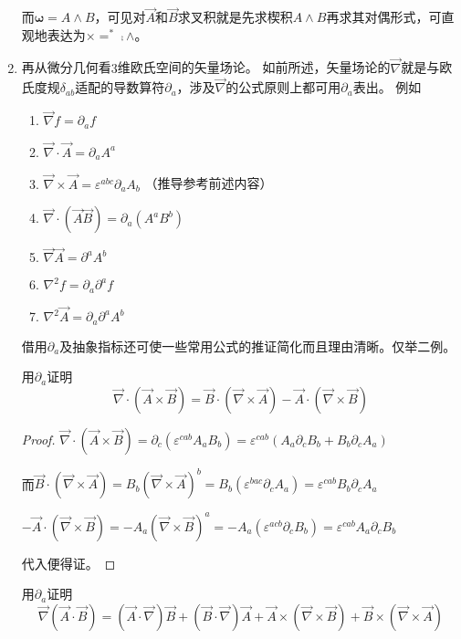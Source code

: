 \begin{enumerate}[（1）]
    而$\bm\omega = A \wedge B$，可见对$\vec A$和$\vec B$求叉积就是先求楔积$A \wedge B$再求其对偶形式，可直观地表达为$\times = ^* \comp \wedge$。
    \item 再从微分几何看$3$维欧氏空间的矢量场论。
    如前所述，矢量场论的$\vec\nabla$就是与欧氏度规$\delta_{ab}$适配的导数算符$\partial_a$，涉及$\vec\nabla$的公式原则上都可用$\partial_a$表出。
    例如
    \begin{enumerate}[（a）]
        \item $\vec\nabla f = \partial_af$
        \item $\vec\nabla \cdot \vec A = \partial_aA^a$
        \item $\vec\nabla \times \vec A = \varepsilon^{abc}\partial_aA_b$ （推导参考前述内容）
        \item $\vec\nabla \cdot (\vec A \vec B) = \partial_a(A^aB^b)$
        \item $\vec\nabla\vec A = \partial^aA^b$
        \item $\nabla^2f = \partial_a\partial^af$
        \item $\nabla^2\vec A = \partial_a\partial^aA^b$
    \end{enumerate}
    借用$\partial_a$及抽象指标还可使一些常用公式的推证简化而且理由清晰。仅举二例。
    
    \begin{example}
    用$\partial_a$证明
    $$\vec\nabla\cdot(\vec A \times \vec B) = \vec B \cdot (\vec\nabla \times \vec A) - \vec A \cdot (\vec\nabla \times \vec B)$$
    \end{example}

    \begin{proof}
        $\vec\nabla\cdot(\vec A \times \vec B) = \partial_c(\varepsilon^{cab}A_aB_b) = \varepsilon^{cab}(A_a\partial_cB_b + B_b\partial_cA_a)$
        
        而$\vec B \cdot (\vec\nabla \times \vec A) = B_b(\vec\nabla \times \vec A)^b = B_b(\varepsilon^{bac}\partial_cA_a) = \varepsilon^{cab}B_b\partial_cA_a$
        
        $-\vec A \cdot (\vec\nabla \times \vec B) = -A_a(\vec\nabla \times \vec B)^a = -A_a(\varepsilon^{acb}\partial_cB_b) = \varepsilon^{cab}A_a\partial_cB_b$
        
        代入便得证。
    \end{proof}

    \begin{example}
        用$\partial_a$证明
        $$\vec\nabla(\vec A \cdot \vec B) = (\vec A \cdot \vec\nabla)\vec B + (\vec B \cdot \vec\nabla)\vec A + \vec A \times (\vec\nabla \times \vec B) + \vec B \times (\vec\nabla \times \vec A)$$
    \end{example}


\end{enumerate}
